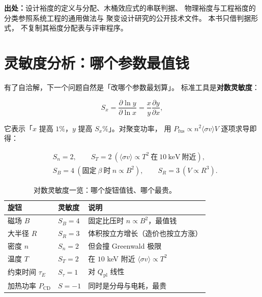 {\footnotesize
\textbf{出处：}设计裕度的定义与分配、木桶效应式的串联判据、
物理裕度与工程裕度的分类参照系统工程的通用做法与
聚变设计研究的公开技术文件。
本书只借判据形式，
不复制其裕度分配表与评审程序。
}

\section{灵敏度分析：哪个参数最值钱}
\label{sec:app-az-sensitivity}

有了自洽解，下一个问题自然是「改哪个参数最划算」。
标准工具是\textbf{对数灵敏度}：

\begin{equation}
S_x=\frac{\partial\ln y}{\partial\ln x}
=\frac{x}{y}\frac{\partial y}{\partial x},
\label{eq:app-az-sens}
\end{equation}

它表示「$x$ 提高 $1\%$，$y$ 提高 $S_x\%$」。对聚变功率，
用 $P_\mathrm{fus}\propto n^2\langle\sigma v\rangle V$ 逐项求导即得：

\begin{equation}
\begin{aligned}
&S_n=2,\qquad S_T=2\ (\langle\sigma v\rangle\propto T^2\ \text{在}\ 10\ \mathrm{keV}\ \text{附近}),\\
&S_B=4\ (\text{固定}\ \beta\ \text{时}\ n\propto B^2),\qquad S_R=3\ (V\propto R^3).
\end{aligned}
\label{eq:app-az-sens2}
\end{equation}

\begin{table}[htbp]
\centering
\small
\setlength{\tabcolsep}{4pt}
\caption{对数灵敏度一览：哪个旋钮值钱、哪个最贵。}
\label{tab:app-az-sens}
\begin{tabular}{p{4.2cm}p{2.4cm}p{5.0cm}}
\toprule
旋钮 & 灵敏度 & 说明 \\
\midrule
磁场 $B$ & $S_B=4$ & 固定比压时 $n\propto B^2$，最值钱 \\
大半径 $R$ & $S_R=3$ & 体积按立方增长（造价也按立方涨） \\
密度 $n$ & $S_n=2$ & 但会撞 Greenwald 极限 \\
温度 $T$ & $S_T=2$ & 在 $10$ keV 附近 $\langle\sigma v\rangle\propto T^2$ \\
约束时间 $\tau_E$ & $S_\tau=1$ & 对 $Q_\mathrm{pl}$ 线性 \\
加热功率 $P_\mathrm{CD}$ & $S=-1$ & 同时是分母与电耗，最贵 \\
\bottomrule
\end{tabular}

\end{table}

